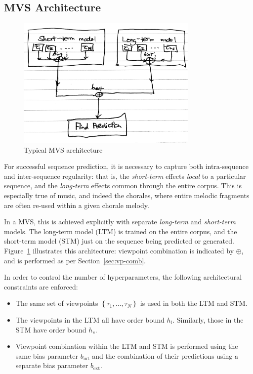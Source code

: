 \documentclass[12pt,a4paper,twoside,openright]{report}
\newcommand{\set}[1]{ \left\{ #1 \right\} }
\begin{document}
\subsection{MVS Architecture}\label{sec:mvs-arch}

\begin{figure}[H]
\centering
\includegraphics[width=250pt]{figs/mvs_arch_tmp.jpg}
\caption{Typical MVS architecture}
\label{fig:mvs-arch}
\end{figure}

For successful sequence prediction, it is necessary to capture both
intra-sequence and inter-sequence regularity: that is, the \emph{short-term}
effects \emph{local} to a particular sequence, and the \emph{long-term} effects
common through the entire corpus.  This is especially true of music, and indeed
the chorales, where entire melodic fragments are often re-used within a given
chorale melody.

In a MVS, this is achieved explicitly with separate \emph{long-term} and
\emph{short-term} models. The long-term model (LTM) is trained on the entire
corpus, and the short-term model (STM) just on the sequence being predicted or
generated. Figure~\ref{fig:mvs-arch} illustrates this architecture: viewpoint
combination is indicated by $\oplus$, and is performed as per
Section~\ref{sec:vp-comb}.

In order to control the number of hyperparameters, the following architectural
constraints are enforced:
\begin{itemize}
  \item The same set of viewpoints $\set{\tau_1, \ldots, \tau_N}$ is used in both
    the LTM and STM. 
  \item The viewpoints in the LTM all have order bound $h_l$. Similarly, those
    in the STM have order bound $h_s$.
  \item Viewpoint combination within the LTM and STM is performed using the same
    bias parameter $b_{\mathrm{int}}$ and the combination of their predictions
    using a separate bias parameter $b_{\mathrm{ext}}$.
\end{itemize}
\end{document}
